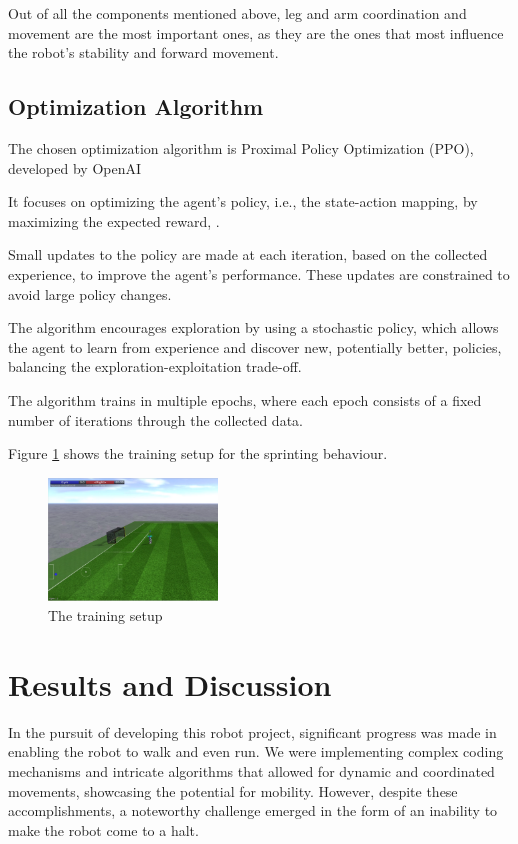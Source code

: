 \documentclass[conference]{IEEEtran}
\begin{document}
Out of all the components mentioned above, leg and arm coordination and movement are the most important
ones, as they are the ones that most influence the robot's stability and forward movement.

\subsection{Optimization Algorithm}\label{Optimization Algorithm}

The chosen optimization algorithm is Proximal Policy Optimization (PPO), developed by OpenAI \cite{ppo-openai}

It focuses on optimizing the agent's policy, i.e., the state-action mapping, by maximizing the expected reward, \cite{ppo}.

Small updates to the policy are made at each iteration, based on the collected experience, to improve the agent's performance. These updates are constrained to avoid large policy changes.

The algorithm encourages exploration by using a stochastic policy, which allows the agent to learn from experience and discover new, potentially better, policies, balancing the exploration-exploitation trade-off.

The algorithm trains in multiple epochs, where each epoch consists of a fixed number of iterations through
the collected data.

Figure \ref{fig:training} shows the training setup for the sprinting behaviour.

\begin{figure}[htbp]
    \centerline{\includegraphics[width=0.4\textwidth]{images/training.png}}
    \caption{The training setup}
    \label{fig:training}
\end{figure}


\section{Results and Discussion}\label{Results and Discussion}

In the pursuit of developing this robot project, significant progress was made in enabling the robot to walk and even run. We were implementing complex coding mechanisms and intricate algorithms that allowed for dynamic and coordinated movements, showcasing the potential for mobility. However, despite these accomplishments, a noteworthy challenge emerged in the form of an inability to make the robot come to a halt.
\end{document}
